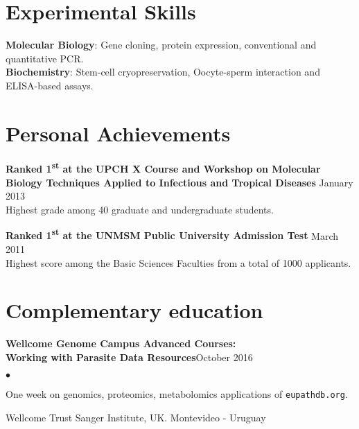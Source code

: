 \documentclass[margin,line]{res}
\newenvironment{list2}{
  \begin{list}{$\bullet$}{%
      \setlength{\itemsep}{0in}
      \setlength{\parsep}{0in} \setlength{\parskip}{0in}
      \setlength{\topsep}{0in} \setlength{\partopsep}{0in}
      \setlength{\leftmargin}{0.2in}}}{\end{list}}
\begin{document}
\begin{resume}
\section{\sc Experimental Skills}
{\bf Molecular Biology}: Gene cloning, protein expression, conventional and quantitative PCR.\\
{\bf Biochemistry}: Stem-cell cryopreservation, Oocyte-sperm interaction and ELISA-based assays.\\ 

\newpage

\section{\sc Personal Achievements}

{\bf Ranked 1\textsuperscript{st} at the UPCH X Course and Workshop on Molecular\\Biology Techniques Applied to Infectious and Tropical Diseases} \hfill January 2013\\
Highest grade among 40 graduate and undergraduate students. %

{\bf Ranked 1\textsuperscript{st} at the UNMSM Public University Admission Test} \hfill March 2011\\
Highest score among the Basic Sciences Faculties from a total of 1000 applicants.\\%

\section{\sc Complementary education}

{\bf Wellcome Genome Campus Advanced Courses:\\Working with Parasite Data Resources}\hfill {October 2016}\\
	\vspace*{-.1in}%
\begin{list2} %
	\item One week on genomics, proteomics, metabolomics applications of \texttt{eupathdb.org}.
	\item Wellcome Trust Sanger Institute, UK. Montevideo - Uruguay %
\end{list2}


\end{resume}
\end{document}
